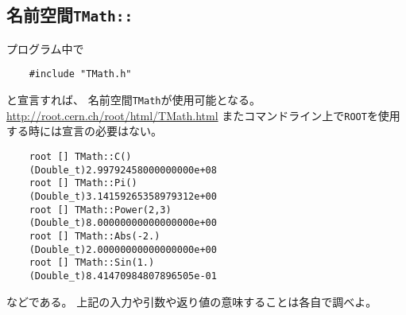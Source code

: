   \subsection{名前空間\texttt{TMath::}}
  プログラム中で
\begin{verbatim}
	#include "TMath.h"
\end{verbatim}
と宣言すれば、
名前空間\texttt{TMath}が使用可能となる。
\url{http://root.cern.ch/root/html/TMath.html}
またコマンドライン上で\verb|ROOT|を使用する時には宣言の必要はない。
\begin{verbatim}
	root [] TMath::C()
	(Double_t)2.99792458000000000e+08
	root [] TMath::Pi()
	(Double_t)3.14159265358979312e+00
	root [] TMath::Power(2,3)
	(Double_t)8.00000000000000000e+00
	root [] TMath::Abs(-2.)
	(Double_t)2.00000000000000000e+00
	root [] TMath::Sin(1.)
	(Double_t)8.41470984807896505e-01
\end{verbatim}
などである。
上記の入力や引数や返り値の意味することは各自で調べよ。
